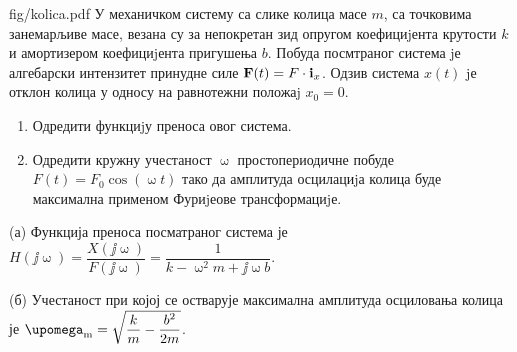 \begin{slikaDesno}{fig/kolica.pdf}
    \PID
    У механичком систему са слике колица масе $m$, са точковима занемарљиве масе, 
    везана су за непокретан зид опругом коефициjента крутости $k$ и амортизером 
    коефициjента пригушења $b$. Побуда посмтраног система jе алгебарски
    интензитет принудне силе 
    ${\bf F} (t) = F \cdot {\bf i}_x$. Одзив система $x(t)$ jе отклон колица 
    у односу на равнотежни положаj $x_0 = 0$.
\end{slikaDesno}
\begin{enumerate}[label=(\alph*)]
    \item Одредити  функциjу
    преноса овог система. 
    \item Одредити кружну учестаност $\upomega$ простопериодичне побуде
    $F(t) = F_0 \cos(\upomega t)$ тако да амплитуда осцилациjа колица буде максимална
    применом Фуриjеове трансформациjе.
\end{enumerate}

\REZULTAT
(а) Функција преноса посматраног система је 
$H(\jj\upomega) = \dfrac{X(\jj\upomega)}{F(\jj\upomega)} = 
\dfrac{1}{k - \upomega^2 m + \jj\upomega b}$.

(б) Учестаност при којој се остварује максимална амплитуда осциловања колица је
$\upomega_{\rm m} = 
\sqrt{
    \dfrac{k}{m}
    -
    \dfrac{b^2}{2m}
}$.